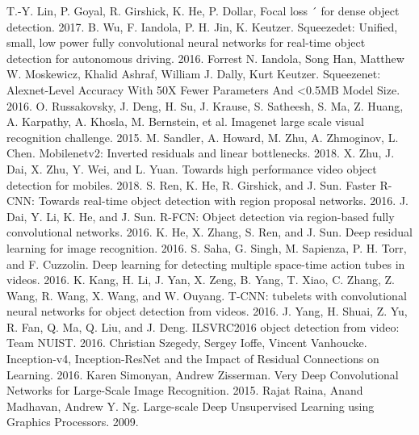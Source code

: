 \documentclass[conference]{IEEEtran}
\begin{document}
\begin{thebibliography}{00}
 T.-Y. Lin, P. Goyal, R. Girshick, K. He, P. Dollar, Focal loss ´
for dense object detection. 2017.
 B. Wu, F. Iandola, P. H. Jin, K. Keutzer. Squeezedet: Unified, small, low power fully convolutional neural networks for real-time object detection for autonomous driving. 2016.
 Forrest N. Iandola, Song Han, Matthew W. Moskewicz, Khalid Ashraf, William J. Dally, Kurt Keutzer. Squeezenet: Alexnet-Level Accuracy With 50X Fewer Parameters And <0.5MB Model Size. 2016.
 O. Russakovsky, J. Deng, H. Su, J. Krause, S. Satheesh, S. Ma, Z. Huang, A. Karpathy, A. Khosla, M. Bernstein, et al. Imagenet large scale visual recognition challenge. 2015.
 M. Sandler, A. Howard, M. Zhu, A. Zhmoginov, L. Chen. Mobilenetv2: Inverted residuals and linear bottlenecks. 2018.
 X. Zhu, J. Dai, X. Zhu, Y. Wei, and L. Yuan. Towards high performance video object detection for mobiles. 2018.
 S. Ren, K. He, R. Girshick, and J. Sun. Faster R-CNN: Towards real-time object detection with region proposal networks. 2016.
 J. Dai, Y. Li, K. He, and J. Sun. R-FCN: Object detection via region-based fully convolutional networks. 2016.
 K. He, X. Zhang, S. Ren, and J. Sun. Deep residual learning for image recognition. 2016.
 S. Saha, G. Singh, M. Sapienza, P. H. Torr, and F. Cuzzolin. Deep learning for detecting multiple space-time action tubes in videos. 2016.
 K. Kang, H. Li, J. Yan, X. Zeng, B. Yang, T. Xiao, C. Zhang, Z. Wang, R. Wang, X. Wang, and W. Ouyang. T-CNN: tubelets with convolutional neural networks for object detection from videos. 2016.
 J. Yang, H. Shuai, Z. Yu, R. Fan, Q. Ma, Q. Liu, and J. Deng. ILSVRC2016 object detection from video: Team NUIST. 2016.
 Christian Szegedy, Sergey Ioffe, Vincent Vanhoucke. Inception-v4, Inception-ResNet and the Impact of Residual Connections on Learning. 2016.
 Karen Simonyan, Andrew Zisserman. Very Deep Convolutional Networks for Large-Scale Image Recognition. 2015.
 Rajat Raina, Anand Madhavan, Andrew Y. Ng. Large-scale Deep Unsupervised Learning using Graphics Processors. 2009.
\vspace{12pt}
\end{thebibliography}
\end{document}
